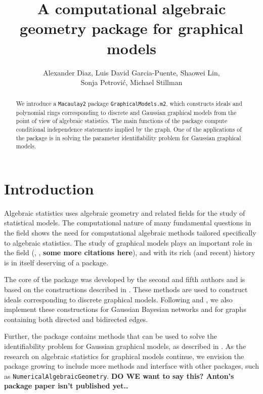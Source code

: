 \documentclass{article}
\title{A computational algebraic geometry package for graphical models}
\author{Alexander Diaz, Luis David Garcia-Puente, Shaowei Lin, \\Sonja Petrovi\'c, Michael Stillman}
\date{}
\theoremstyle{definition}
\begin{document}
\maketitle
\begin{abstract}
We introduce a {\tt Macaulay2} package {\tt GraphicalModels.m2}, 
which constructs ideals and polynomial rings corresponding to discrete and Gaussian graphical models from the point of view of algebraic statistics. 
The main functions of the package compute conditional independence statements implied by the graph. 
One of the applications of the package is in solving the parameter identifiability problem for Gaussian graphical models. 
\end{abstract}

\section{Introduction}
Algebraic statistics uses algebraic geometry and related fields for the study of statistical models. The computational nature of many fundamental questions in the field shows the need for  computational algebraic methods tailored specifically to algebraic statistics. The study of graphical models plays an important role in the field (\cite{Lauritzen}, \cite{DSS}, {\bf some more citations here}), and with its rich (and recent) history is in itself deserving of a package. 

The core of the package was developed by the second and fifth authors and is based on the constructions described in \cite{GSS}.  These methods are used to construct ideals corresponding to discrete graphical models. 
Following \cite{S} and \cite{STD}, we also implement these constructions for Gaussian Bayesian networks and for graphs containing both directed and bidirected edges.  %

Further, the package contains methods that can be used to solve the identifiability problem for Gaussian graphical models, as described in \cite{GPSS}.
As the research on algebraic statistics for graphical models continue, we envision the package growing to include more methods and interface with other packages, such as {\tt NumericalAlgebraicGeometry}. {\bf DO WE want to say this? Anton's package paper isn't published yet..}
\end{document}
